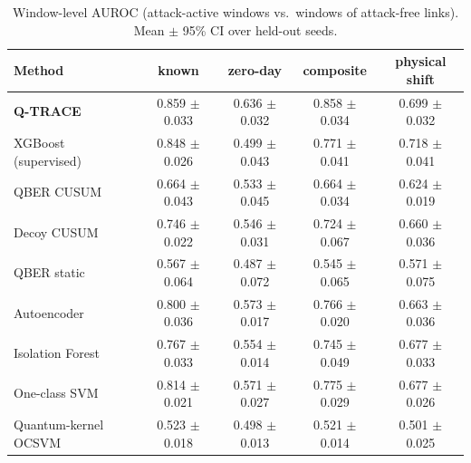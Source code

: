 \begin{table}[t]
\centering
\caption{Window-level AUROC (attack-active windows vs.\ windows of attack-free links). Mean $\pm$ 95\% CI over held-out seeds.}
\label{tab:auroc}
\begin{tabular}{lcccc}
\toprule
Method & known & zero-day & composite & physical shift \\
\midrule
\textbf{Q-TRACE} & 0.859 $\pm$ 0.033 & 0.636 $\pm$ 0.032 & 0.858 $\pm$ 0.034 & 0.699 $\pm$ 0.032 \\
XGBoost (supervised) & 0.848 $\pm$ 0.026 & 0.499 $\pm$ 0.043 & 0.771 $\pm$ 0.041 & 0.718 $\pm$ 0.041 \\
QBER CUSUM & 0.664 $\pm$ 0.043 & 0.533 $\pm$ 0.045 & 0.664 $\pm$ 0.034 & 0.624 $\pm$ 0.019 \\
Decoy CUSUM & 0.746 $\pm$ 0.022 & 0.546 $\pm$ 0.031 & 0.724 $\pm$ 0.067 & 0.660 $\pm$ 0.036 \\
QBER static & 0.567 $\pm$ 0.064 & 0.487 $\pm$ 0.072 & 0.545 $\pm$ 0.065 & 0.571 $\pm$ 0.075 \\
Autoencoder & 0.800 $\pm$ 0.036 & 0.573 $\pm$ 0.017 & 0.766 $\pm$ 0.020 & 0.663 $\pm$ 0.036 \\
Isolation Forest & 0.767 $\pm$ 0.033 & 0.554 $\pm$ 0.014 & 0.745 $\pm$ 0.049 & 0.677 $\pm$ 0.033 \\
One-class SVM & 0.814 $\pm$ 0.021 & 0.571 $\pm$ 0.027 & 0.775 $\pm$ 0.029 & 0.677 $\pm$ 0.026 \\
Quantum-kernel OCSVM & 0.523 $\pm$ 0.018 & 0.498 $\pm$ 0.013 & 0.521 $\pm$ 0.014 & 0.501 $\pm$ 0.025 \\
\bottomrule
\end{tabular}
\end{table}
